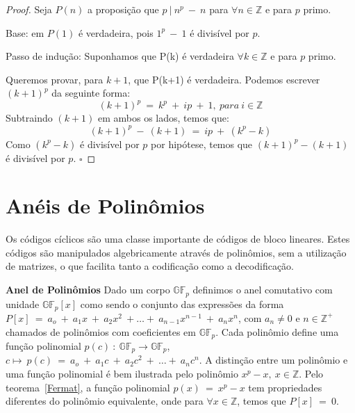 \begin{proof} Seja $P(n)$ a proposição que $p\ |\ n^p\ -\ n$ para $\forall n \in \mathbb{Z}$ e para $p$ primo.

Base: em $P(1)$ é verdadeira, pois $1^p\ -\ 1$ é divisível por $p$.

Passo de indução: Suponhamos que P(k) é verdadeira $\forall k \in \mathbb{Z}$ e para $p$ primo.

Queremos provar, para $k+1$, que P(k+1) é verdadeira. Podemos escrever $(k+1)^p$ da seguinte forma:
$$
(k+1)^p\ =\ k^p\ +\ ip\ +\ 1,\ para\ i \in \mathbb{Z}
$$
Subtraindo $(k+1)$ em ambos os lados, temos que:
$$
(k+1)^p\ -\ (k+1)\ =\ ip\ +\ (k^p-k)
$$
Como $(k^p-k)$ é divisível por $p$ por hipótese, temos que $(k+1)^p - (k+1)$ é divisível por $p$.
$\square$
\end{proof}

\section{Anéis de Polinômios}

Os códigos cíclicos são uma classe importante de códigos de bloco lineares. Estes códigos são manipulados algebricamente através de polinômios, sem a utilização de matrizes, o que facilita tanto a codificação como a decodificação.

\begin{definition} {\bf Anel de Polinômios} \label{AnelPol}  Dado um corpo $\mathbb{GF}_p$ definimos o anel comutativo com unidade $\mathbb{GF}_p[x]$ como sendo o conjunto das expressões da forma $P[x]\ =\ a_o\ +\ a_1x\ +\ a_2x^2\ + \ldots +\ a_{n-1}x^{n-1}\ +\ a_nx^n$, com $a_n \neq 0$ e $n \in \mathbb{Z}^+$ chamados de polinômios com coeficientes em $\mathbb{GF}_p$. Cada polinômio define uma função polinomial $p(c)\ :\ \mathbb{GF}_p \rightarrow \mathbb{GF}_p$, $c \longmapsto\ p(c)\ =\ a_o\ +\ a_1c\ +\ a_2c^2\ +\ \ldots +\ a_nc^n$. A distinção entre um polinômio e uma função polinomial é bem ilustrada pelo polinômio $x^p-x,\ x \in \mathbb{Z}$. Pelo teorema~\ref{Fermat}, a função polinomial $p(x)\ =\ x^p-x$ tem propriedades diferentes do polinômio equivalente, onde para $\forall x \in \mathbb{Z}$, temos que $P[x]\ =\ 0$.
\end{definition}


